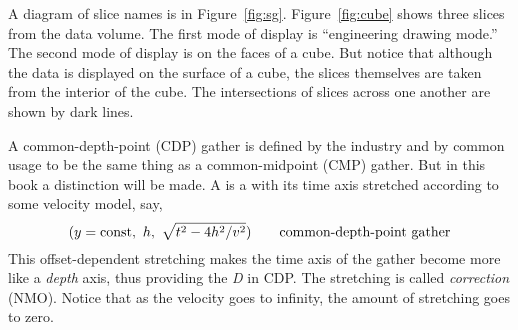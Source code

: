 \par
{}
A diagram of slice names is in Figure~\ref{fig:sg}.
Figure~\ref{fig:cube} shows three slices from the data volume.
The first mode of display is ``engineering drawing mode.''
The second mode of display is on the faces of a cube.
But notice that although the data is displayed on the surface
of a cube, the slices themselves are taken from the interior of the cube.
The intersections of slices across one another are shown by dark lines.

\par
A common-depth-point (CDP) gather is defined
by the industry and by common usage
to be the same thing as a common-midpoint (CMP) gather.
But in this book
a distinction will be made.
A  is a  with its time
axis stretched according to some velocity model, say,
$$
(y=\hbox{const},\ h,\ \sqrt{t^2 - 4h^2 /v^2 }) \quad \quad
\hbox{common-depth-point gather}
$$
This offset-dependent stretching makes the time axis of the gather 
become more like a
{\em depth}
axis, thus providing the
{\em D} 
in CDP.
The stretching is called 
{\em 
{} correction
}
(NMO).
Notice that as the velocity goes to infinity, the amount of stretching
goes to zero.

